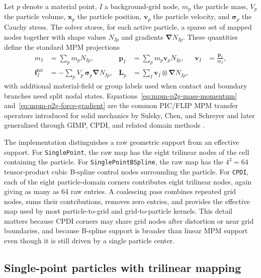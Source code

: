 Let $p$ denote a material point, $I$ a background-grid node, $m_p$ the particle mass, $V_p$ the particle volume, $\boldsymbol{x}_p$ the particle position, $\boldsymbol{v}_p$ the particle velocity, and $\boldsymbol{\sigma}_p$ the Cauchy stress.  The solver stores, for each active particle, a sparse set of mapped nodes together with shape values $N_{Ip}$ and gradients $\boldsymbol{\nabla}N_{Ip}$.  These quantities define the standard MPM projections
\begin{align}
  m_I &= \sum_p m_p N_{Ip},
  &
  \boldsymbol{p}_I &= \sum_p m_p \boldsymbol{v}_p N_{Ip},
  &
  \boldsymbol{v}_I &= \frac{\boldsymbol{p}_I}{m_I},
  \label{eq:mpm-p2g-mass-momentum}\\
  \boldsymbol{f}^{\mathrm{int}}_I
    &= -\sum_p V_p\,\boldsymbol{\sigma}_p\boldsymbol{\nabla}N_{Ip},
  &
  \boldsymbol{L}_p
    &= \sum_I \boldsymbol{v}_I\otimes \boldsymbol{\nabla}N_{Ip},
  \label{eq:mpm-p2g-force-gradient}
\end{align}
with additional material-field or group labels used when contact and boundary branches need split nodal states.  Equations~\eqref{eq:mpm-p2g-mass-momentum} and~\eqref{eq:mpm-p2g-force-gradient} are the common PIC/FLIP MPM transfer operators introduced for solid mechanics by Sulsky, Chen, and Schreyer and later generalized through GIMP, CPDI, and related domain methods \cite{sulsky1994history,sulsky1995solid,bardenhagen2004gimp,sadeghirad2011cpdi}.

The implementation distinguishes a raw geometric support from an effective support.  For \texttt{SinglePoint}, the raw map has the eight trilinear nodes of the cell containing the particle.  For \texttt{SinglePointBSpline}, the raw map has the $4^3=64$ tensor-product cubic B-spline control nodes surrounding the particle.  For \texttt{CPDI}, each of the eight particle-domain corners contributes eight trilinear nodes, again giving as many as 64 raw entries.  A coalescing pass combines repeated grid nodes, sums their contributions, removes zero entries, and provides the effective map used by most particle-to-grid and grid-to-particle kernels.  This detail matters because CPDI corners may share grid nodes after distortion or near grid boundaries, and because B-spline support is broader than linear MPM support even though it is still driven by a single particle center.

\subsection{Single-point particles with trilinear mapping}
\label{subsec:single-point-linear}

